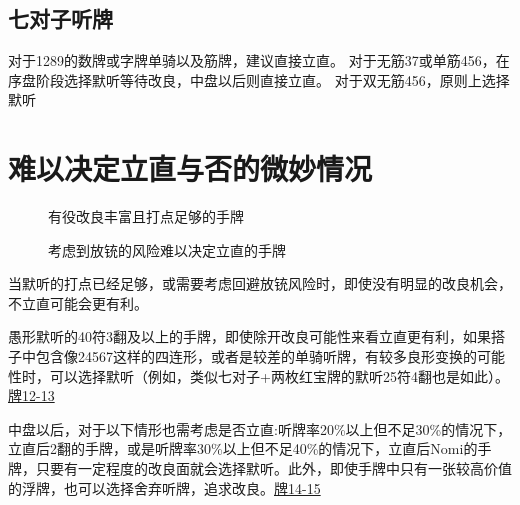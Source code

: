 \subsection{七对子听牌}
对于1289的数牌或字牌单骑以及筋牌，建议直接立直。
对于无筋37或单筋456，在序盘阶段选择默听等待改良，中盘以后则直接立直。
对于双无筋456，原则上选择默听

\section{难以决定立直与否的微妙情况}
\begin{figure}
    \caption{有役改良丰富且打点足够的手牌} \label{lec3:pai12-13}
    \par\bigskip
\end{figure}

\begin{figure}
    \caption{考虑到放铳的风险难以决定立直的手牌} \label{lec3:pai14-15}
    \par\bigskip
\end{figure}
当默听的打点已经足够，或需要考虑回避放铳风险时，即使没有明显的改良机会，不立直可能会更有利。

愚形默听的40符3翻及以上的手牌，即使除开改良可能性来看立直更有利，如果搭子中包含像24567这样的四连形，或者是较差的单骑听牌，有较多良形变换的可能性时，可以选择默听（例如，类似七对子+两枚红宝牌的默听25符4翻也是如此）。\hyperref[lec3:pai12-13]{牌12-13}

中盘以后，对于以下情形也需考虑是否立直:听牌率20\%以上但不足30\%的情况下，立直后2翻的手牌，或是听牌率30\%以上但不足40\%的情况下，立直后Nomi的手牌，只要有一定程度的改良面就会选择默听。此外，即使手牌中只有一张较高价值的浮牌，也可以选择舍弃听牌，追求改良。\hyperref[lec3:pai14-15]{牌14-15}

